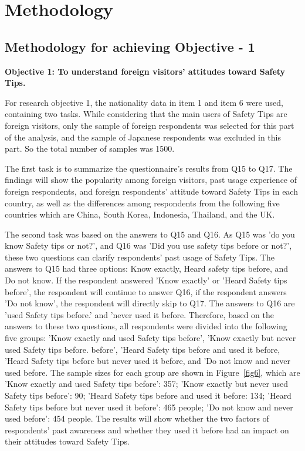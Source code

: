 


\chapter{Methodology }

\section{Methodology for achieving Objective - 1 }

\textbf{Objective 1: To understand foreign visitors' attitudes toward Safety Tips.}

For research objective 1, the nationality data in item 1 and item 6 were used, containing two tasks. While considering that the main users of Safety Tips are foreign visitors, only the sample of foreign respondents was selected for this part of the analysis, and the sample of Japanese respondents was excluded in this part. So the total number of samples was 1500.

The first task is to summarize the questionnaire's results from Q15 to Q17. The findings will show the popularity among foreign visitors, past usage experience of foreign respondents, and foreign respondents' attitude toward Safety Tips in each country, as well as the differences among respondents from the following five countries which are China, South Korea, Indonesia, Thailand, and the UK.

The second task was based on the answers to Q15 and Q16. As Q15 was 'do you know Safety tips or not?', and Q16 was 'Did you use safety tips before or not?', these two questions can clarify respondents' past usage of Safety Tips. The answers to Q15 had three options: Know exactly, Heard safety tips before, and Do not know. If the respondent answered 'Know exactly' or 'Heard Safety tips before', the respondent will continue to answer Q16, if the respondent answers 'Do not know', the respondent will directly skip to Q17. The answers to Q16 are 'used Safety tips before.' and 'never used it before. Therefore, based on the answers to these two questions, all respondents were divided into the following five groups: 'Know exactly and used Safety tips before', 'Know exactly but never used Safety tips before. before', 'Heard Safety tips before and used it before, 'Heard Safety tips before but never used it before, and 'Do not know and never used before. The sample sizes for each group are shown in Figure~\ref{fig6}, which are 'Know exactly and used Safety tips before': 357; 'Know exactly but never used Safety tips before': 90; 'Heard Safety tips before and used it before: 134; 'Heard Safety tips before but never used it before': 465 people; 'Do not know and never used before': 454 people. The results will show whether the two factors of respondents' past awareness and whether they used it before had an impact on their attitudes toward Safety Tips.


